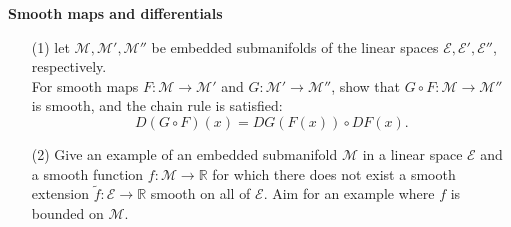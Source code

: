 \documentclass[en, oneside]{assignment}
\begin{document}
\begin{prob} \textbf{Smooth maps and differentials}\
    \begin{itemize}
        \item[(1)] let $\mathcal{M}, \mathcal{M}', \mathcal{M}''$ be embedded submanifolds of the linear spaces 
        $\mathcal{E}, \mathcal{E}', \mathcal{E}''$, respectively.\\
        For smooth maps $F: \mathcal{M} \to \mathcal{M}'$ and $G: \mathcal{M}' \to \mathcal{M}''$, 
        show that $G \circ F: \mathcal{M} \to \mathcal{M}''$ is smooth, and the chain rule is satisfied:
        \begin{equation*}
            D(G \circ F)(x) = DG(F(x)) \circ DF(x).
        \end{equation*}
        \item[(2)] Give an example of an embedded submanifold $\mathcal{M}$ in a linear space $\mathcal{E}$ 
        and a smooth function $f: \mathcal{M} \to \mathbb{R}$ for which 
        there does not exist a smooth extension $\tilde{f}: \mathcal{E} \to \mathbb{R}$ smooth on all of $\mathcal{E}$.
        Aim for an example where $f$ is bounded on $\mathcal{M}$.
    \end{itemize}
\end{prob}
\end{document}
